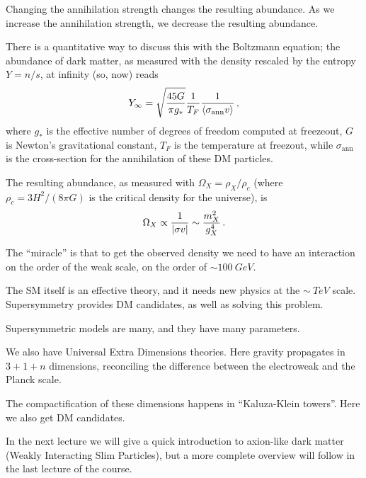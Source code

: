 \documentclass[main.tex]{subfiles}
\begin{document}
Changing the annihilation strength changes the resulting abundance. 
As we increase the annihilation strength, we decrease the resulting abundance.

There is a quantitative way to discuss this with the Boltzmann equation; the abundance of dark matter, as measured with the density rescaled by the entropy \(Y = n / s\), at infinity (so, now) reads 
%
\begin{align}
Y_{\infty } = \sqrt{\frac{45 G}{\pi g_*}} \frac{1}{T_F} \frac{1}{\expval{\sigma _{\text{ann}} v}}
\,,
\end{align}
%
where \(g_*\) is the effective number of degrees of freedom computed at freezeout, \(G\) is Newton's gravitational constant, \(T_F\) is the temperature at freezout, while \(\sigma _{\text{ann}}\) is the cross-section for the annihilation of these DM particles. 


The resulting abundance, as measured with \(\Omega _X = \rho _X / \rho _c\) (where \(\rho _c = 3 H^2 / (8 \pi G)\) is the critical density for the universe), is 
%
\begin{align}
\Omega_X \propto \frac{1}{\abs{\sigma v}} \sim \frac{m_X^2}{g_X^{4}}
\,.
\end{align}

The ``miracle'' is that to get the observed density we need 
to have an interaction on the order of the weak scale, on the order of 
\(\sim \SI{100}{GeV}\). 

The SM itself is an effective theory, and it needs new physics 
at the \(\sim \SI{}{TeV}\) scale. 
Supersymmetry provides DM candidates, as well as solving this problem. 

Supersymmetric models are many, and they have many parameters. 

We also have Universal Extra Dimensions theories. 
Here gravity propagates in \(3+1+n\) dimensions, reconciling
the difference between the electroweak and the Planck scale. 

The compactification of these dimensions happens in ``Kaluza-Klein towers''.
Here we also get DM candidates.

In the next lecture we will give a quick introduction to axion-like dark matter (Weakly Interacting Slim Particles), but a more complete overview will follow in the last lecture of the course. 

 
\end{document}
